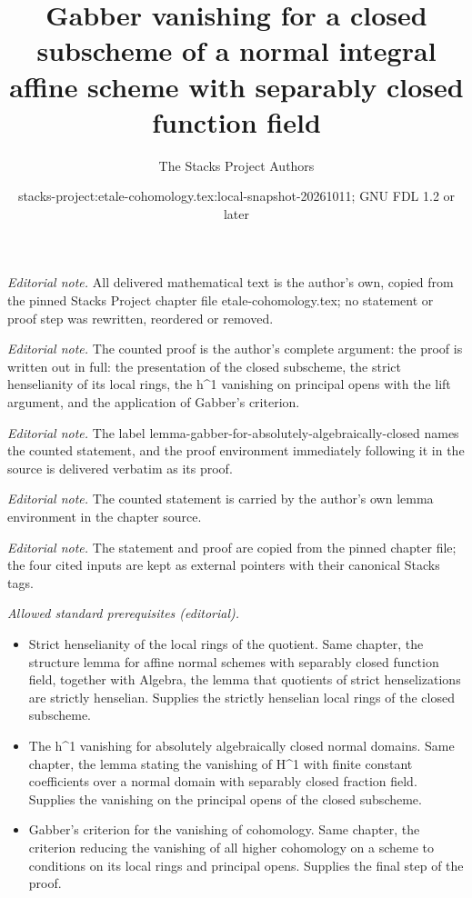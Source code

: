 \documentclass[10pt,a4paper]{amsart}
\title{Gabber vanishing for a closed subscheme of a normal integral affine scheme with separably closed function field}
\author{The Stacks Project Authors}
\date{stacks-project:etale-cohomology.tex:local-snapshot-20261011; GNU FDL 1.2 or later}
\theoremstyle{plain}
\theoremstyle{definition}
\theoremstyle{remark}
\numberwithin{equation}{subsection}
\begin{document}
\maketitle
\noindent\textit{Editorial note.} All delivered mathematical text is the author's own, copied from the pinned Stacks Project chapter file etale-cohomology.tex; no statement or proof step was rewritten, reordered or removed.\par\medskip
\noindent\textit{Editorial note.} The counted proof is the author's complete argument: the proof is written out in full: the presentation of the closed subscheme, the strict henselianity of its local rings, the h\textasciicircum{}1 vanishing on principal opens with the lift argument, and the application of Gabber's criterion.\par\medskip
\noindent\textit{Editorial note.} The label lemma-gabber-for-absolutely-algebraically-closed names the counted statement, and the proof environment immediately following it in the source is delivered verbatim as its proof.\par\medskip
\noindent\textit{Editorial note.} The counted statement is carried by the author's own lemma environment in the chapter source.\par\medskip
\noindent\textit{Editorial note.} The statement and proof are copied from the pinned chapter file; the four cited inputs are kept as external pointers with their canonical Stacks tags.\par\medskip
\noindent\textit{Allowed standard prerequisites (editorial).}\begin{itemize}
\item Strict henselianity of the local rings of the quotient. Same chapter, the structure lemma for affine normal schemes with separably closed function field, together with Algebra, the lemma that quotients of strict henselizations are strictly henselian. Supplies the strictly henselian local rings of the closed subscheme.
\item The h\textasciicircum{}1 vanishing for absolutely algebraically closed normal domains. Same chapter, the lemma stating the vanishing of H\textasciicircum{}1 with finite constant coefficients over a normal domain with separably closed fraction field. Supplies the vanishing on the principal opens of the closed subscheme.
\item Gabber's criterion for the vanishing of cohomology. Same chapter, the criterion reducing the vanishing of all higher cohomology on a scheme to conditions on its local rings and principal opens. Supplies the final step of the proof.
\end{itemize}\medskip
\end{document}
